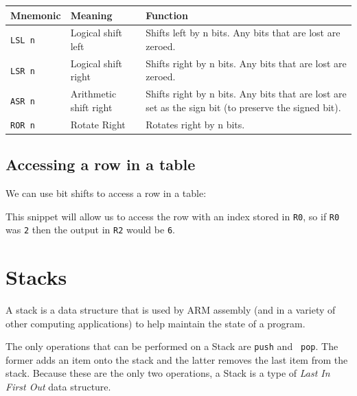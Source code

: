 \begin{center}
	\begin{tabularx}{\textwidth}{|l|X|X|}
		\hline
		{\bf Mnemonic} & {\bf Meaning} & {\bf Function}\\ \hline

		{\tt LSL n} & Logical shift left & Shifts left by n bits. Any bits that
		are lost are zeroed.\\ \hline

		{\tt LSR n} & Logical shift right &  Shifts right by n bits. Any bits
		that are lost are zeroed.\\ \hline

		{\tt ASR n} & Arithmetic shift right & Shifts right by n bits. Any bits
		that are lost are set as the sign bit (to preserve the signed bit).\\
		\hline

		{\tt ROR n} & Rotate Right & Rotates right by n bits.\\ \hline
	\end{tabularx}
\end{center}

\subsection{Accessing a row in a table}

We can use bit shifts to access a row in a table:


This snippet will allow us to access the row with an index stored in {\tt R0},
so if {\tt R0} was {\tt 2} then the output in {\tt R2} would be {\tt 6}.

\section{Stacks}


A stack is a data structure that is used by ARM assembly (and in a variety of
other computing applications) to help maintain the state of a program.

The only operations that can be performed on a Stack are {\tt push} and {\tt
pop}. The former adds an item onto the stack and the latter removes the last
item from the stack. Because these are the only two operations, a Stack is a
type of {\it Last In First Out} data structure.


